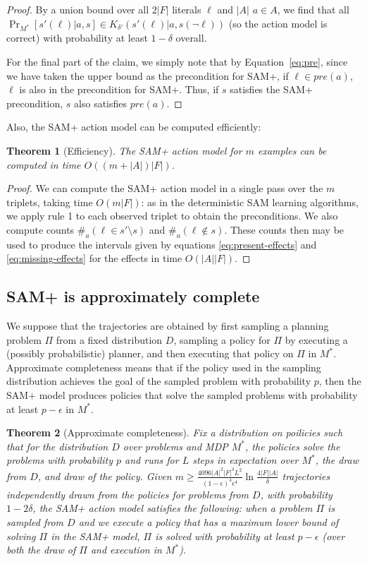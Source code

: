 \documentclass[letterpaper]{article} %
\newtheorem{theorem}{Theorem}
\newcommand{\pre}{\textit{pre}}
\begin{document}
\begin{proof}
By a union bound over all $2|F|$ literals $\ell$ and $|A|$ $a\in A$, we find that all $\Pr_{M^*}[s'(\ell)|a,s]\in K_{\delta'}(s'(\ell)|a,s(\neg\ell))$ (so the action model is correct) with probability at least $1-\delta$ overall.

For the final part of the claim, we simply note that by Equation~\ref{eq:pre}, since we have taken the upper bound as the precondition for SAM+, if $\ell\in\pre(a)$, $\ell$ is also in the precondition for SAM+. Thus, if $s$ satisfies the SAM+ precondition, $s$ also satisfies $\pre(a)$.
\end{proof}

\noindent
Also, the SAM+ action model can be computed efficiently:
\begin{theorem}[Efficiency]
The SAM+ action model for $m$ examples can be computed in time $O((m+|A|)|F|)$.
\end{theorem}
\begin{proof}
We can compute the SAM+ action model in a single pass over the $m$ triplets, taking time $O(m|F|)$: as in the deterministic SAM learning algorithms, we apply rule 1 to each observed triplet to obtain the preconditions. We also compute counts $\#_a(\ell\in s'\setminus s)$ and $\#_a(\ell\notin s)$. These counts then may be used to produce the intervals given by equations \ref{eq:present-effects} and \ref{eq:missing-effects} for the effects in time $O(|A||F|)$.
\end{proof}

\subsection{SAM+ is approximately complete}

We suppose that the trajectories are obtained by first sampling a planning problem $\Pi$ from a fixed distribution $D$, sampling a policy for $\Pi$ by executing a (possibly probabilistic) planner, and then executing that policy on $\Pi$ in $M^*$.
Approximate completeness means that if the policy used in the sampling distribution achieves the goal of the sampled problem with probability $p$, then the SAM+ model produces policies that solve the sampled problems with probability at least $p-\epsilon$ in $M^*$.

\begin{theorem}[Approximate completeness]
\label{thm:sam-ac}
Fix a distribution on poilicies such that for the distribution $D$ over problems and MDP $M^*$, the policies solve the problems with probability $p$ and runs for $L$ steps in expectation over $M^*$, the draw from $D$, and draw of the policy.
Given 
$
m\geq \frac{4096|A|^2|F|^3L^2}{(1-\epsilon)^4\epsilon^4}\ln\frac{4|F||A|}{\delta}
$
trajectories independently drawn from the policies for problems from $D$, with probability $1-2\delta$, the SAM+ action model satisfies the following:  when a problem $\Pi$ is sampled from $D$ and we execute a policy that has a maximum lower bound of solving $\Pi$ in the SAM+ model, $\Pi$ is solved with probability at least $p-\epsilon$ (over both the draw of $\Pi$ and execution in $M^*$).
\end{theorem}
\end{document}
